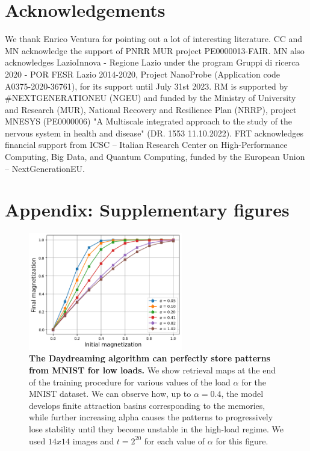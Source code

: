 \documentclass[a4paper]{cas-sc}
\begin{document}
\section{Acknowledgements}

We thank Enrico Ventura for pointing out a lot of interesting literature. CC and MN acknowledge the support of  PNRR MUR project PE0000013-FAIR. MN also acknowledges LazioInnova - Regione Lazio under the program Gruppi di ricerca 2020 - POR FESR Lazio 2014-2020, Project NanoProbe (Application code A0375-2020-36761), for its support until July 31st 2023.
RM is supported by \#NEXTGENERATIONEU (NGEU) and funded by the Ministry of University and Research (MUR), National Recovery and Resilience Plan (NRRP), project MNESYS (PE0000006) "A Multiscale integrated approach to the study of the nervous system in health and disease" (DR. 1553 11.10.2022).
FRT acknowledges financial support from ICSC – Italian Research Center on High-Performance Computing, Big Data, and Quantum Computing, funded by the European Union – NextGenerationEU.


\printcredits


% 
% 



\appendix
\setcounter{figure}{0}
\section{Appendix: Supplementary figures}

\begin{figure}[h!]    
    \centering
    \includegraphics[width=0.60\textwidth]{fig8.png}
    \caption{ 
    \textbf{The Daydreaming algorithm can perfectly store patterns from MNIST for low loads.} 
   We show retrieval maps at the end of the training procedure for various values of the load $\alpha$ for the MNIST dataset. We can observe how, up to $\alpha = 0.4$, the model develops finite attraction basins corresponding to the memories, while further increasing alpha causes the patterns to progressively lose stability until they become unstable in the high-load regime. We used $14 x 14$ images and $t=2^{20}$ for each value of $\alpha$ for this figure.}
   \label{fig:mnist-basins}
\end{figure}
\end{document}
